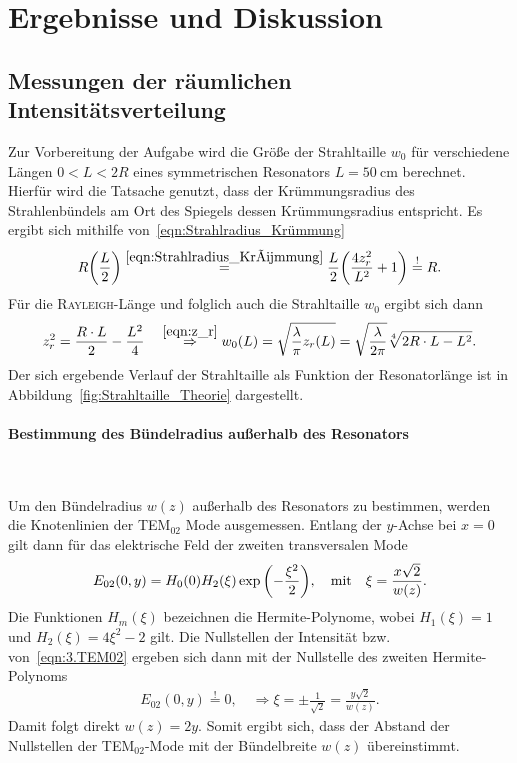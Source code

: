 \documentclass[a4paper,twoside,final]{article}
\begin{document}
\section{Ergebnisse und Diskussion}\label{sec:ErgebnisseUndDiskussion}

\subsection{Messungen der räumlichen Intensitätsverteilung}

Zur Vorbereitung der Aufgabe wird die Größe der Strahltaille $w_0$ für verschiedene Längen $0 < L < 2R$ eines symmetrischen Resonators $L = \SI{50}{\centi\metre}$ berechnet. Hierfür wird die Tatsache genutzt, dass der Krümmungsradius des Strahlenbündels am Ort des Spiegels dessen Krümmungsradius entspricht. Es ergibt sich mithilfe von~\eqref{eqn:Strahlradius_Krümmung}
\begin{align}
  R\qty(\frac{L}{2}) \overset{\eqref{eqn:Strahlradius_Krümmung} }{=} \frac{L}{2} \qty(\frac{4 z_r^2}{L^2} + 1) \overset{!}{=} R.
\end{align}
Für die \textsc{Rayleigh}-Länge und folglich auch die Strahltaille $w_0$ ergibt sich dann
\begin{align}
  z_r^2 = \frac{R \cdot L}{2} - \frac{L^2}{4} \quad \overset{\eqref{eqn:z_r}}{\Rightarrow} w_0(L) = \sqrt{\frac{\lambda}{\pi} z_r(L)} = \sqrt{\frac{\lambda}{2\pi}}\sqrt[4]{2 R \cdot L - L^2}.
\end{align}
Der sich ergebende Verlauf der Strahltaille als Funktion der Resonatorlänge ist in Abbildung~\ref{fig:Strahltaille_Theorie} dargestellt.



\paragraph{Bestimmung des Bündelradius außerhalb des Resonators}$~$

Um den Bündelradius $w(z)$ außerhalb des Resonators zu bestimmen, werden die Knotenlinien der TEM$_{02}$ Mode ausgemessen. Entlang der $y$-Achse bei $x=0$ gilt dann für das elektrische Feld der zweiten transversalen Mode~\cite{Eichler}
\begin{align}\label{eqn:3.TEM02}
  E_{02}(0,y) = H_0(0) H_2(\xi) \exp\qty(-\frac{\xi^2}{2}), \quad \text{mit} \quad \xi = \frac{x\sqrt{2}}{w(z)}.
\end{align}
Die Funktionen $H_m(\xi)$ bezeichnen die Hermite-Polynome, wobei $H_1(\xi) = 1$ und $H_2(\xi) = 4\xi^2- 2$ gilt. Die Nullstellen der Intensität bzw. von~\eqref{eqn:3.TEM02} ergeben sich dann mit der Nullstelle des zweiten Hermite-Polynoms
\begin{align}
  E_{02}(0,y) \overset{!}{=} 0, \quad \Rightarrow \xi = \pm \frac{1}{\sqrt{2}} = \frac{y \sqrt{2}}{w(z)}.
\end{align}
Damit folgt direkt $w(z) = 2y$. Somit ergibt sich, dass der Abstand der Nullstellen der TEM$_{02}$-Mode mit der Bündelbreite $w(z)$ übereinstimmt.
\end{document}
